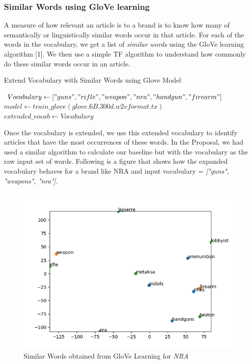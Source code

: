 \documentclass{article}
\begin{document}
\subsubsection {Similar Words using GloVe learning}
A measure of how relevant an article is to a brand is to know how many of semantically or linguistically similar words occur in that article. For each of the words in the vocabulary, we get a list of \textit{similar words} using the GloVe learning algorithm [1]. We then use a simple TF algorithm to understand how commonly do these similar words occur in an article.

\begin{center}
\begin{algorithm}
  \caption{Extend Vocabulary with Similar Words using Glove Model}

 $Vocabulary \gets ["guns", "rifle", "weapon", "nra", "handgun", "firearm"] $\;
 $model \gets train\_glove(\textit{glove.6B.300d.w2vformat.tx}) $\;
  {
      $extended\_vocab \gets Vocabulary $\;
    \;
  }
\end{algorithm}
\end{center}

Once the vocabulary is extended, we use this extended vocabulary to identify articles that have the most occurrences of these words. In the Proposal, we had used a similar algorithm to calculate our baseline but with the vocabulary as the raw input set of words. Following is a figure that shows how the expanded vocabulary behaves for a brand like NRA and input vocabulary = \textit {["guns", "weapons", "nra"]}.

\begin{figure}[ht]
	\centering
 	 \includegraphics[width=0.5\linewidth]{similar_words_nra.png}
	  \caption{Similar Words obtained from GloVe Learning for \textit{NRA}}
 	 \label{fig:Similar Words for NRA}
\end{figure}
\end{document}
